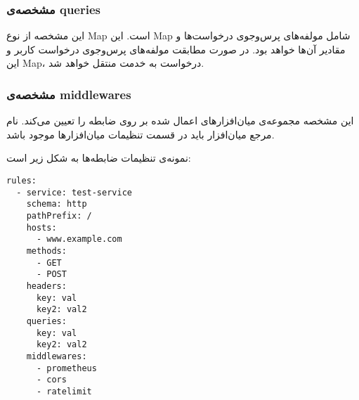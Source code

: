 \subsubsection*{مشخصه‌ی queries}
این مشخصه از نوع Map است. این Map شامل مولفه‌های پرس‌وجوی درخواست‌ها و مقادیر آن‌ها خواهد بود. در صورت مطابقت مولفه‌های پرس‌و‌جوی درخواست کاربر و این Map، درخواست به خدمت منتقل خواهد شد.

\subsubsection*{مشخصه‌ی middlewares}
این مشخصه مجموعه‌ی میان‌افزار‌های اعمال شده بر روی ضابطه را تعیین می‌کند. نام مرجع میان‌افزار باید در قسمت تنظیمات میان‌افزار‌ها موجود باشد.

نمونه‌ی تنظیمات ضابطه‌ها به شکل زیر است:

\begin{latin}
  \begin{lstlisting}
rules:
  - service: test-service
    schema: http
    pathPrefix: /
    hosts:
      - www.example.com
    methods:
      - GET
      - POST
    headers:
      key: val
      key2: val2
    queries:
      key: val
      key2: val2
    middlewares:
      - prometheus
      - cors
      - ratelimit

  \end{lstlisting}
\end{latin}

